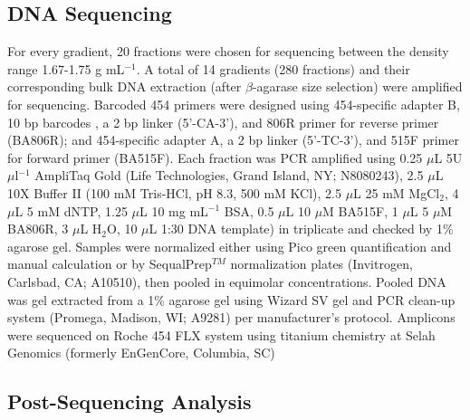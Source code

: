 \subsection{DNA Sequencing}  For every gradient, 20 fractions were chosen for
sequencing between the density range 1.67-1.75 g mL$^{-1}$.
A total of 14 gradients (280 fractions) and their corresponding bulk DNA
extraction (after $\beta$-agarase size selection) were amplified for
sequencing. Barcoded 454 primers were designed using 454-specific adapter B, 10
bp barcodes \cite{Hamady_2008}, a 2 bp linker (5'-CA-3'), and 806R primer for
reverse primer (BA806R); and 454-specific adapter A, a 2 bp linker (5'-TC-3'),
and 515F primer for forward primer (BA515F). Each fraction was PCR amplified
using 0.25 $\mu$L 5U $\mu$l$^{-1}$ AmpliTaq Gold (Life
Technologies, Grand Island, NY; N8080243), 2.5 $\mu$L 10X Buffer II (100 mM
Tris-HCl, pH 8.3, 500 mM KCl), 2.5 $\mu$L 25 mM MgCl$_{2}$, 4 $\mu$L 5 mM dNTP,
1.25 $\mu$L 10 mg mL$^{-1}$ BSA, 0.5 $\mu$L 10 $\mu$M BA515F,
1 $\mu$L 5 $\mu$M BA806R, 3 $\mu$L H$_{2}$O, 10 $\mu$L 1:30 DNA template) in
triplicate and checked by 1\% agarose gel. Samples were normalized either using
Pico green quantification and manual calculation or by
SequalPrep$^{TM}$ normalization plates (Invitrogen, Carlsbad, CA;
A10510), then pooled in equimolar concentrations. Pooled DNA was gel extracted
from a 1\% agarose gel using Wizard SV gel and PCR clean-up system (Promega,
Madison, WI; A9281) per manufacturer's protocol.  Amplicons were sequenced on
Roche 454 FLX system using titanium chemistry at Selah Genomics (formerly
EnGenCore, Columbia, SC)    

\subsection{Post-Sequencing Analysis}

